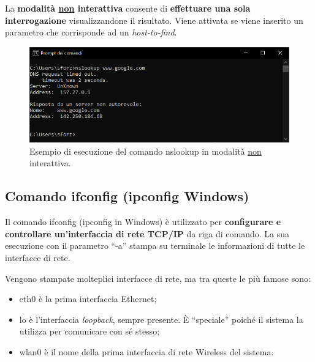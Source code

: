 \documentclass[a4paper]{article}
\newcommand{\dquotes}[1]{``#1''}
\begin{document}
	\noindent
	La \textbf{modalità \underline{non} interattiva} consente di \textbf{effettuare una sola interrogazione} visualizzandone il risultato. Viene attivata se viene inserito un parametro che corrisponde ad un \emph{host-to-find}.
	
	\begin{figure}[!htp]
		\centering
		\includegraphics[width=\textwidth]{img/altri-strumenti/nslookup2.png}
		\caption{Esempio di esecuzione del comando \textsf{nslookup} in modalità \underline{non} interattiva.}
	\end{figure}\newpage
	
	\subsection{Comando \textsf{ifconfig} (\textsf{ipconfig} Windows)}\label{comando ifconfig (ipconfig Windows)}
	
	Il comando \textcolor{Red3}{\textsf{ifconfig}} (\textsf{ipconfig} in Windows) è utilizzato per \textbf{configurare e controllare un'interfaccia di rete TCP/IP} da riga di comando. La sua esecuzione con il parametro \dquotes{\textsf{-a}} stampa su terminale le informazioni di tutte le interfacce di rete.\newline
	
	\noindent
	Vengono stampate molteplici interfacce di rete, ma tra queste le più famose sono:
	\begin{itemize}
		\item \textsf{eth0} è la prima interfaccia Ethernet;
		
		\item \textsf{lo} è l'interfaccia \emph{loopback}, sempre presente. È \dquotes{speciale} poiché il sistema la utilizza per comunicare con sé stesso;
		
		\item \textsf{wlan0} è il nome della prima interfaccia di rete Wireless del sistema.
	\end{itemize}
	
\end{document}
